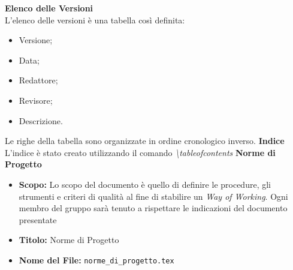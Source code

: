 \documentclass[a4paper, 12pt]{article}
\begin{document}
\textbf{Elenco delle Versioni} \\
L'elenco delle versioni è una tabella così definita:
\begin{itemize}
    \item Versione;
    \item Data;
    \item Redattore;
    \item Revisore;
    \item Descrizione.
\end{itemize}
Le righe della tabella sono organizzate in ordine cronologico inverso. 
\newline \newline
\textbf{Indice} \\
L'indice è stato creato utilizzando il comando \textit{\textbackslash tableofcontents}
\newline \newline
\textbf{Norme di Progetto}
\begin{itemize}
    \item \textbf{Scopo:} Lo scopo del documento è quello di definire le procedure, gli strumenti e criteri di qualità al fine di stabilire un \textit{Way of Working}. Ogni membro del gruppo sarà tenuto a rispettare le indicazioni del documento presentate
    \item \textbf{Titolo:} Norme di Progetto
    \item \textbf{Nome del File:} \texttt{norme\_di\_progetto.tex}
\end{itemize} 
\end{document}
